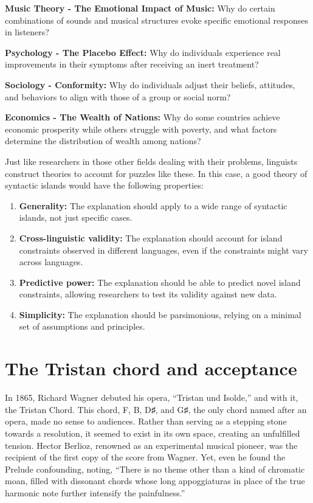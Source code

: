     \textbf{Music Theory - The Emotional Impact of Music:} Why do certain combinations of sounds and musical structures evoke specific emotional responses in listeners?

    \textbf{Psychology - The Placebo Effect:} Why do individuals experience real improvements in their symptoms after receiving an inert treatment?

    \textbf{Sociology - Conformity:} Why do individuals adjust their beliefs, attitudes, and behaviors to align with those of a group or social norm?

    \textbf{Economics - The Wealth of Nations:} Why do some countries achieve economic prosperity while others struggle with poverty, and what factors determine the distribution of wealth among nations?


Just like researchers in those other fields dealing with their problems, linguists construct theories to account for puzzles like these. In this case, a good theory of syntactic islands would have the following properties:

\begin{enumerate}
\item \textbf{Generality:} The explanation should apply to a wide range of syntactic islands, not just specific cases.
\item \textbf{Cross-linguistic validity:} The explanation should account for island constraints observed in different languages, even if the constraints might vary across languages.
\item \textbf{Predictive power:} The explanation should be able to predict novel island constraints, allowing researchers to test its validity against new data.
\item \textbf{Simplicity:} The explanation should be parsimonious, relying on a minimal set of assumptions and principles.
\end{enumerate}



\section{The Tristan chord and acceptance} \label{sec:tristan}
In 1865, Richard Wagner debuted his opera, ``Tristan und Isolde,'' and with it, the Tristan Chord. This chord, F, B, D♯, and G♯, the only chord named after an opera, made no sense to audiences. Rather than serving as a stepping stone towards a resolution, it seemed to exist in its own space, creating an unfulfilled tension. Hector Berlioz, renowned as an experimental musical pioneer, was the recipient of the first copy of the score from Wagner. Yet, even he found the Prelude confounding, noting, ``There is no theme other than a kind of chromatic moan, filled with dissonant chords whose long appoggiaturas in place of the true harmonic note further intensify the painfulness.'' %

